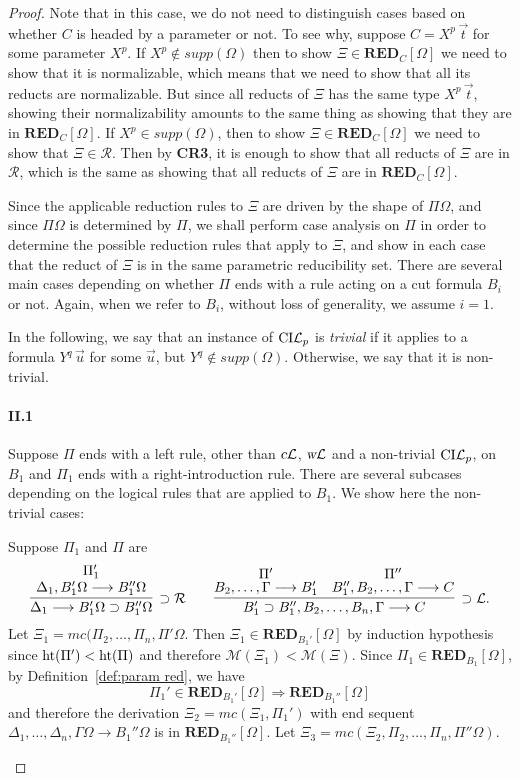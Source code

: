 \documentclass[preprint]{elsarticle}
\def\Mscr{{\mathcal M}}
\def\Rscr{{\mathcal R}}
\newcommand{\Seq}[2]{#1\longrightarrow #2}
\newcommand{\cL}{\hbox{\sl c}{\cal L}}
\newcommand{\coindLP}{{\rm CI}{\cal L}_p}
\newcommand{\measure}[1]{{\rm ht}(#1)}
\newcommand{\oimpL}{\oimp{\cal L}}
\newcommand{\oimpR}{\oimp{\cal R}}
\newcommand{\oimp}{\supset}
\newcommand{\wL}{\hbox{\sl w}{\cal L}}
\def\RED{{\mathbf{RED}}}
\begin{document}
\begin{proof}
Note that in this case, we do not need to distinguish cases based on
whether $C$ is headed by a parameter or not.  To see why, suppose $C =
X^p\,\vec t$ for some parameter $X^p$.  If $X^p \not \in supp(\Omega)$
then to show $\Xi \in \RED_C[\Omega]$ we need to show that it is
normalizable, which means that we need to show that all its reducts
are normalizable.  But since all reducts of $\Xi$ has the same type
$X^p\,\vec t$, showing their normalizability amounts to the same thing
as showing that they are in $\RED_C[\Omega]$.  If $X^p \in
supp(\Omega)$, then to show $\Xi \in \RED_C[\Omega]$ we need to show
that $\Xi \in \Rscr$. Then by {\bf CR3}, it is enough to show that all
reducts of $\Xi$ are in $\Rscr$, which is the same as showing that all
reducts of $\Xi$ are in $\RED_C[\Omega]$.

Since the applicable reduction rules to $\Xi$ are driven by the shape
of $\Pi\Omega$, and since $\Pi\Omega$ is determined by $\Pi$, we shall
perform case analysis on $\Pi$ in order to determine the possible
reduction rules that apply to $\Xi$, and show in each case that the
reduct of $\Xi$ is in the same parametric reducibility set.  There are
several main cases depending on whether $\Pi$ ends with a rule acting
on a cut formula $B_i$ or not.  Again, when we refer to $B_i$, without
loss of generality, we assume $i=1$.

In the following, we say that an instance of $\coindLP$ is
\emph{trivial} if it applies to a formula $Y^q \,\vec u$ for some
$\vec u$, but $Y^q \not \in supp(\Omega)$. Otherwise, we say that it
is non-trivial. 

\paragraph{\bf II.1} Suppose $\Pi$ ends with a left rule, other than
$\cL$, $\wL$ and a non-trivial $\coindLP$, on $B_1$ and $\Pi_1$ ends
with a right-introduction rule.  There are several subcases depending
on the logical rules that are applied to $B_1$. We show here the
non-trivial cases:
\begin{trivlist}
\item[\fbox{$\oimpR/\oimpL$}] Suppose $\Pi_1$ and $\Pi$ are
$$
\infer[\oimpR] {\Seq{\Delta_1}{B_1'\Omega \oimp B_1''\Omega}} {
  \deduce{\Seq{\Delta_1,B_1'\Omega}{B_1''\Omega}}{\Pi_1'} } \qquad
\infer[\oimpL.]  {\Seq{B_1'\oimp B_1'',B_2,\dots, B_n,\Gamma}{C}} {
  \deduce{\Seq{B_2,\dots,\Gamma}{B_1'}}{\Pi'} &
  \deduce{\Seq{B_1'',B_2,\dots,\Gamma}{C}}{\Pi''} }
$$
Let $\Xi_1 = mc(\Pi_2,\ldots,\Pi_n,\Pi'\Omega$. 
Then $\Xi_1 \in \RED_{B_1'}[\Omega]$ by induction hypothesis since
$\measure{\Pi'} < \measure{\Pi}$ and therefore $\Mscr(\Xi_1) <
\Mscr(\Xi)$.  Since $\Pi_1 \in \RED_{B_1}[\Omega]$, by
Definition~\ref{def:param red}, we have
$$
\Pi_1' \in \RED_{B_1'}[\Omega] \Rightarrow \RED_{B_1''}[\Omega]
$$
and therefore the derivation $\Xi_2= mc(\Xi_1,\Pi_1')$ with end sequent 
$\Seq{\Delta_1,\ldots,\Delta_n,\Gamma\Omega}{B_1''\Omega}$
is in $\RED_{B_1''}[\Omega]$.  Let $\Xi_3 = mc(\Xi_2, \Pi_2,\ldots,
\Pi_n,\Pi''\Omega)$.


\end{trivlist}
\end{proof}
\end{document}
